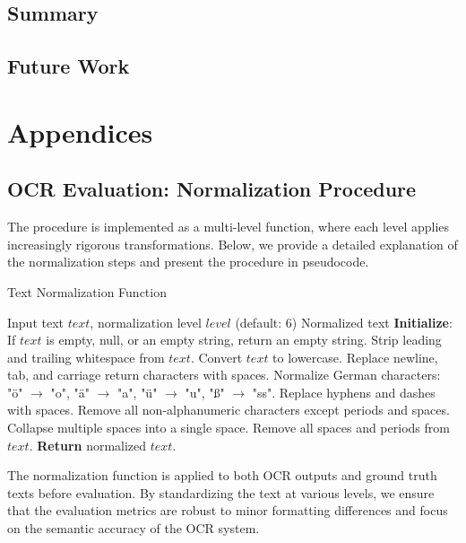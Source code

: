 \documentclass[11pt]{article}
\begin{document}
    \subsection{Summary}
    \subsection{Future Work}





\appendix
\section{Appendices}
\subsection{OCR Evaluation: Normalization Procedure}
\label{app:ocr_normalization}
The procedure is implemented as a multi-level function, where each level applies increasingly rigorous transformations. Below, we provide a detailed explanation of the normalization steps and present the procedure in pseudocode.

\begin{algorithm}[H]
\caption{Text Normalization Function}
\label{alg:normalization}
\begin{algorithmic}[1]
\Require Input text $text$, normalization level $level$ (default: 6)
\Ensure Normalized text
\State \textbf{Initialize}: If $text$ is empty, null, or an empty string, return an empty string.
    \State Strip leading and trailing whitespace from $text$.
\EndIf
{}
    \State Convert $text$ to lowercase.
    \State Replace newline, tab, and carriage return characters with spaces.
    \State Normalize German characters: "ö" $\rightarrow$ "o", "ä" $\rightarrow$ "a", "ü" $\rightarrow$ "u", "ß" $\rightarrow$ "ss".
\EndIf
{}
    \State Replace hyphens and dashes  with spaces.
    \State Remove all non-alphanumeric characters except periods and spaces.
    \State Collapse multiple spaces into a single space.
\EndIf
{}
    \State Remove all spaces and periods from $text$.
\EndIf
\State \textbf{Return} normalized $text$.
\end{algorithmic}
\end{algorithm}

The normalization function is applied to both OCR outputs and ground truth texts before evaluation. By standardizing the text at various levels, we ensure that the evaluation metrics are robust to minor formatting differences and focus on the semantic accuracy of the OCR system.
\end{document}

